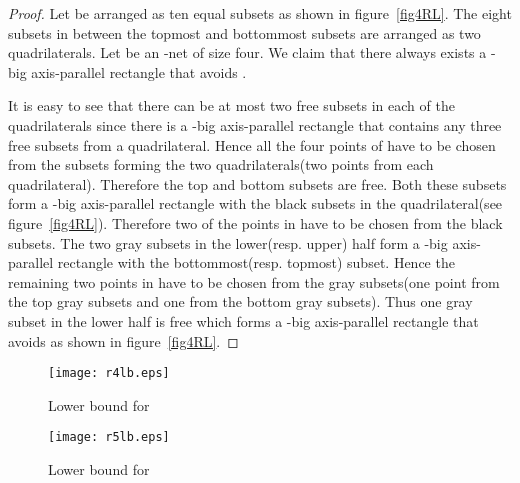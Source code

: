 \begin{proof}
Let  be arranged as ten equal subsets as shown in figure~\ref{fig4RL}. The eight
subsets in between the topmost and bottommost subsets are arranged as two
quadrilaterals. Let  be an -net of size four. We
claim that there always exists a -big
axis-parallel rectangle that avoids . 

It is easy to see that there can be at most two free subsets in each of the
quadrilaterals since there is a -big axis-parallel rectangle that contains
any three free subsets from a quadrilateral. Hence all the four points of  have to be chosen from the  subsets forming the two quadrilaterals(two points from each quadrilateral). Therefore the top and bottom
subsets are free. Both these subsets form a -big axis-parallel
rectangle with the black subsets in the quadrilateral(see figure~\ref{fig4RL}). Therefore two of the points in  have to be chosen from the black subsets. The
two gray subsets in the lower(resp. upper) half form a -big axis-parallel
rectangle with the bottommost(resp. topmost) subset. Hence the remaining two points in  have to be chosen from the gray subsets(one point from the top gray subsets and one from the bottom gray subsets). Thus one gray subset in the
lower half is free which forms a -big axis-parallel rectangle that avoids  as shown
in figure~\ref{fig4RL}.

\end{proof}
\begin{figure}
\begin{minipage}[b]{160pt}


\begin{center}
\texttt{[image: r4lb.eps]}
\caption{Lower bound for }
\label{fig4RL}
\end{center}

\end{minipage}
\begin{minipage}[b]{200pt}
 \begin{center}
 \texttt{[image: r5lb.eps]}
\caption{Lower bound for }
\label{fig5lb}
\end{center}
\end{minipage}

\end{figure}

